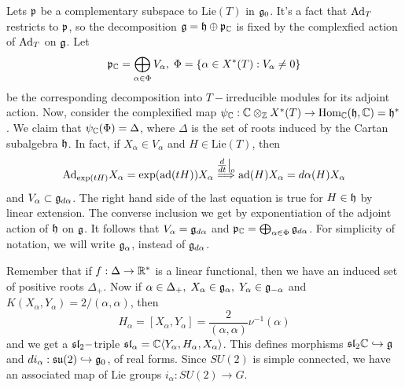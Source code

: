 Lets $\mathfrak{p}$ be a complementary subspace to $\text{Lie}(T)$ in $\mathfrak{g}_0$. It's a fact that 
$\text{Ad}_T$ restricts to $\mathfrak{p}$, so the decomposition $\mathfrak{g}=\mathfrak{h}\oplus \mathfrak{p}_{\mathbb{C}}$ is fixed 
by the complexfied action of $\text{Ad}_T$ on $\mathfrak{g}$. Let 
\begin{equation}
    \mathfrak{p}_{\mathbb{C}}=\bigoplus_{\alpha\in \Phi}V_\alpha,\; \Phi=\{\alpha\in X^*(T):V_\alpha\neq0\} 
\end{equation}
be the corresponding decomposition into $T-$irreducible modules for its adjoint action. Now, consider the complexified 
map $\psi_{\mathbb{C}}:\mathbb{C}\otimes_{\mathbb{Z}}X^*(T)\to \text{Hom}_{\mathbb{C}}(\mathfrak{h},\mathbb{C})=\mathfrak{h}^*$. We claim that 
$\psi_{\mathbb{C}}(\Phi)=\Delta$, where $\Delta$ is the set of roots induced by the Cartan subalgebra $\mathfrak{h}$. 
In fact, if $X_\alpha\in V_\alpha$ and $H\in\text{Lie}(T)$, then
\begin{equation}
    \text{Ad}_{\exp(tH)}X_\alpha=\exp(\text{ad}(tH))X_\alpha\overset{\tfrac{d}{dt}\big|_0}{\Longrightarrow} 
    \text{ad}(H)X_\alpha=d\alpha(H)X_\alpha
\end{equation}
and $V_\alpha\subset \mathfrak{g}_{d\alpha}$. The right hand side of the last equation is true for $H\in\mathfrak{h}$ by linear 
extension. The converse inclusion we get by exponentiation of the adjoint action of 
$\mathfrak{h}$ on $\mathfrak{g}$. It follows that $V_\alpha=\mathfrak{g}_{d\alpha}$ 
and $\mathfrak{p}_{\mathbb{C}}=\bigoplus_{\alpha\in\Phi}\mathfrak{g}_{d\alpha}$. For simplicity of notation, we will write 
$\mathfrak{g}_\alpha$, instead of $\mathfrak{g}_{d\alpha}$.\par 

Remember that if $f:\Delta\to\mathbb{R}^*$ is a linear functional, then we have an induced set of positive roots $\Delta_+$. 
Now if $\alpha\in \Delta_+,\; X_{\alpha}\in\mathfrak{g}_{\alpha},\; Y_{\alpha}\in\mathfrak{g}_{-\alpha}$ and 
$K(X_\alpha,Y_\alpha)=2/(\alpha,\alpha)$, then 
\begin{equation}
    H_\alpha = [X_\alpha,Y_\alpha]= \frac{2}{(\alpha,\alpha)}\nu^{-1}(\alpha)
\end{equation} 
and we get a $\mathfrak{sl}_2-$triple $\mathfrak{sl}_\alpha=\mathbb{C}\langle Y_\alpha,H_\alpha,X_\alpha\rangle$. This defines morphisms 
$\mathfrak{sl}_2\mathbb{C}\hookrightarrow\mathfrak{g}$ and $di_\alpha:\mathfrak{su}(2)\hookrightarrow\mathfrak{g}_0$, of real forms. Since 
$SU(2)$ is simple connected, we have an associated map of Lie groups $i_\alpha:SU(2)\to G$.

